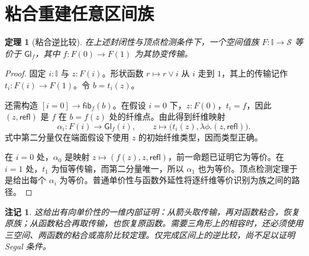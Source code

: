 \documentclass[12pt,oneside,openany,fontset=none]{ctexbook}
\theoremstyle{cn}
\newtheorem{theorem}[definition]{定理}
\newtheorem{remark}[definition]{注记}
\numberwithin{equation}{chapter}
\newcommand{\Sp}{\mathcal S}
\newcommand{\refl}{\mathsf{refl}}
\newcommand{\fib}{\mathsf{fib}}
\newcommand{\Int}{\mathbb I}
\begin{document}
\section{粘合重建任意区间族}
\begin{theorem}[粘合逆比较]
在上述封闭性与顶点检测条件下，一个空间值族 $F:\Int\to\Sp$ 等价于 $\mathsf{Gl}_f$，其中 $f:F(0)\to F(1)$ 为其协变传输。
\end{theorem}
\begin{proof}
固定 $i:\Int$ 与 $z:F(i)$。形状函数 $r\mapsto r\vee i$ 从 $i$ 走到 $1$，其上的传输记作 $t_i:F(i)\to F(1)$。令 $b=t_i(z)$。

还需构造 $[i=0]\to\fib_f(b)$。在假设 $i=0$ 下，$z:F(0)$，$t_i=f$，因此 $(z,\refl)$ 是 $f$ 在 $b=f(z)$ 处的纤维点。由此得到纤维映射
\[
\alpha_i:F(i)\to\mathsf{Gl}_f(i),
\qquad z\longmapsto\bigl(t_i(z),\lambda\phi.(z,\refl)\bigr).
\]
式中第二分量仅在端面假设下使用 $z$ 的初始纤维类型，因而类型正确。

在 $i=0$ 处，$\alpha_0$ 是映射
$z\mapsto(f(z),z,\refl)$，前一命题已证明它为等价。在 $i=1$ 处，$t_1$ 为恒等传输，而第二分量唯一，所以 $\alpha_1$ 也为等价。顶点检测定理于是给出每个 $\alpha_i$ 为等价。普通单价性与函数外延性将逐纤维等价识别为族之间的路径。
\end{proof}
\begin{remark}
这给出有向单价性的一维内部证明：从箭头取传输，再对函数粘合，恢复原族；从函数粘合再取传输，也恢复原函数。需要三角形上的相容时，还必须使用三空间、两函数的粘合或高阶比较定理。仅完成区间上的逆比较，尚不足以证明 Segal 条件。
\end{remark}
\end{document}
